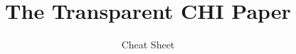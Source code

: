 \documentclass[final,hyperref={pdfpagelabels=false}]{beamer}
\title{The Transparent CHI Paper}
\subtitle{Cheat Sheet}
\begin{document}
  
  \begin{frame}[fragile]{} 
    \vfill
    \begin{columns}[t]
      \begin{column}{.4\linewidth}
        \maketitle
        
      \end{column}
      
      \begin{column}{.6\linewidth}
    
        
      \end{column}
     \end{columns}
    \vfill
  \end{frame}
\clearpage  
  \begin{frame}[fragile]{}
    \begin{columns}[t]
      \begin{column}{0\linewidth}
      \end{column}
            
      \begin{column}{\linewidth}
              
      \end{column}
     \end{columns}
   \end{frame}
\end{document}
